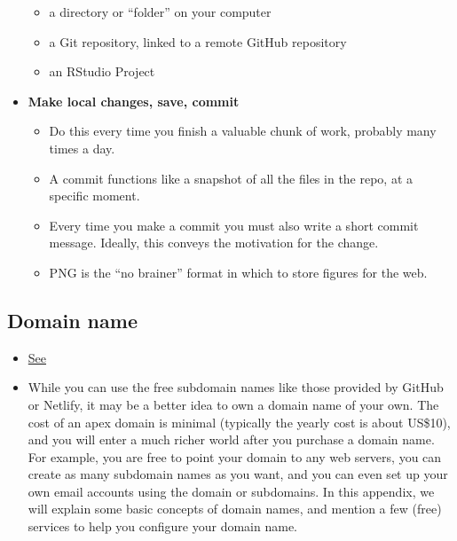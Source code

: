 \documentclass[
]{article}
\providecommand{\tightlist}{%
  \setlength{\itemsep}{0pt}\setlength{\parskip}{0pt}}
\begin{document}
\begin{itemize}
  \begin{itemize}
  \tightlist
  \item
    a directory or ``folder'' on your computer
  \item
    a Git repository, linked to a remote GitHub repository
  \item
    an RStudio Project
  \end{itemize}
\item
  \textbf{Make local changes, save, commit}

  \begin{itemize}
  \tightlist
  \item
    Do this every time you finish a valuable chunk of work, probably
    many times a day.
  \item
    A commit functions like a snapshot of all the files in the repo,
    at a specific moment.
  \item
    Every time you make a commit you must also write a short commit
    message. Ideally, this conveys the motivation for the change.
  \item
    PNG is the ``no brainer'' format in which to store figures for the
    web.
  \end{itemize}
\end{itemize}

\hypertarget{domain-name}{%
\subsection{Domain name}\label{domain-name}}

\begin{itemize}
\tightlist
\item
  \href{https://bookdown.org/yihui/blogdown/domain-name.html\#domain-name}{See}
\item
  While you can use the free subdomain names like those provided by
  GitHub or Netlify, it may be a better idea to own a domain name of
  your own. The cost of an apex domain is minimal (typically the
  yearly cost is about US\$10), and you will enter a much richer world
  after you purchase a domain name. For example, you are free to point
  your domain to any web servers, you can create as many subdomain
  names as you want, and you can even set up your own email accounts
  using the domain or subdomains. In this appendix, we will explain
  some basic concepts of domain names, and mention a few (free)
  services to help you configure your domain name.
\end{itemize}
\end{document}

